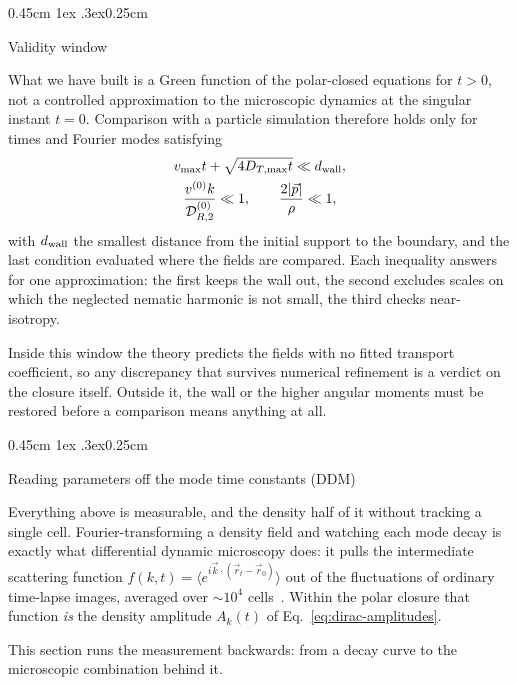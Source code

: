 \documentclass[
  reprint,
  superscriptaddress,
  amsmath,
  amssymb,
  aps,
  pre,
  nofootinbib,
  floatfix
]{revtex4-2}
\makeatletter
\newcommand{\rv}{\vec r}
\newcommand{\pv}{\vec p}
\newcommand{\DRtwo}{\mathcal D_{R,2}^{(0)}}
\def\subsection{\@startsection{subsection}{2}{\z@}%
  {0.45cm \@plus1ex \@minus.3ex}{0.25cm}%
  {\normalfont\small\bfseries\raggedright}}%
\makeatother
\begin{document}
\subsection{Validity window}

What we have built is a Green function of the polar-closed equations for
$t>0$, not a controlled approximation to the microscopic dynamics at the
singular instant $t=0$.  Comparison with a particle simulation therefore holds
only for times and Fourier modes satisfying
\begin{equation}
\begin{gathered}
 v_{\max}t+\sqrt{4D_{T,\max}t}\ll d_{\rm wall},\\
 \frac{v^{(0)} k}{\DRtwo}\ll1,
 \qquad
 \frac{2|\pv|}{\rho}\ll1,
\end{gathered}
 \label{eq:dirac-validity-window}
\end{equation}
with $d_{\rm wall}$ the smallest distance from the initial support to the
boundary, and the last condition evaluated where the fields are compared.
Each inequality answers for one approximation: the first keeps the wall out,
the second excludes scales on which the neglected nematic harmonic is not
small, the third checks near-isotropy.

Inside this window the theory predicts the fields with no fitted transport
coefficient, so any discrepancy that survives numerical refinement is a
verdict on the closure itself.  Outside it, the wall or the higher angular
moments must be restored before a comparison means anything at all.

\subsection{Reading parameters off the mode time constants (DDM)}
\label{sec:mode-inversion}

Everything above is measurable, and the density half of it without tracking a
single cell.  Fourier-transforming a density field and watching each mode
decay is exactly what differential dynamic microscopy does: it pulls the
intermediate scattering function
$f(k,t)=\langle e^{i\vec k\cdot(\rv_t-\rv_0)}\rangle$ out of the fluctuations
of ordinary time-lapse images, averaged over $\sim10^{4}$
cells~\cite{wilson2011,martinez2012}.  Within the polar closure that function
\emph{is} the density amplitude $A_k(t)$ of
Eq.~\eqref{eq:dirac-amplitudes}.

This section runs the measurement backwards: from a decay curve to the
microscopic combination behind it.
\end{document}
